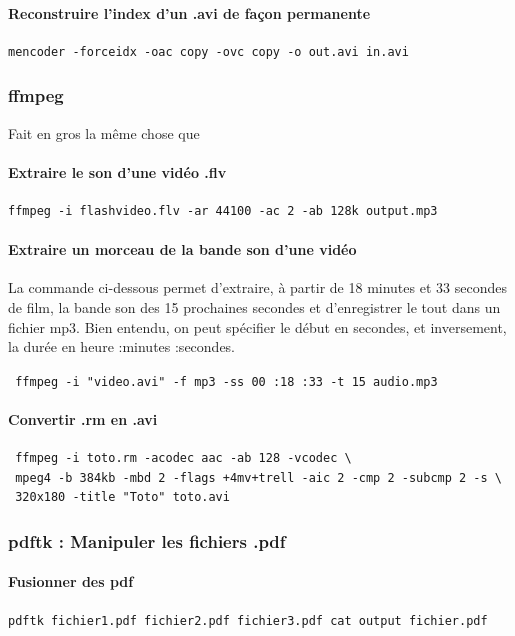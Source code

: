 \documentclass[a4paper,twoside]{article}
\begin{document}
\paragraph{Reconstruire l'index d'un .avi de façon permanente}
\begin{verbatim}
mencoder -forceidx -oac copy -ovc copy -o out.avi in.avi
\end{verbatim}

\subsubsection{ffmpeg}
Fait en gros la même chose que 
\paragraph{Extraire le son d'une vidéo .flv}
\begin{verbatim}
ffmpeg -i flashvideo.flv -ar 44100 -ac 2 -ab 128k output.mp3
\end{verbatim}

\paragraph{Extraire un morceau de la bande son d'une vidéo}
La commande ci-dessous permet d'extraire, à partir de 18 minutes et 33 secondes de film, la bande son des 15 prochaines secondes et d'enregistrer le tout dans un fichier mp3. Bien entendu, on peut spécifier le début en secondes, et inversement, la durée en heure :minutes :secondes.\par

\verb| ffmpeg -i "video.avi" -f mp3 -ss 00 :18 :33 -t 15 audio.mp3|
\paragraph{Convertir .rm en .avi}
\begin{verbatim}
 ffmpeg -i toto.rm -acodec aac -ab 128 -vcodec \
 mpeg4 -b 384kb -mbd 2 -flags +4mv+trell -aic 2 -cmp 2 -subcmp 2 -s \
 320x180 -title "Toto" toto.avi
\end{verbatim}

\subsubsection{pdftk : Manipuler les fichiers .pdf}
\paragraph{Fusionner des pdf}
\begin{verbatim}
pdftk fichier1.pdf fichier2.pdf fichier3.pdf cat output fichier.pdf
\end{verbatim}
\end{document}

